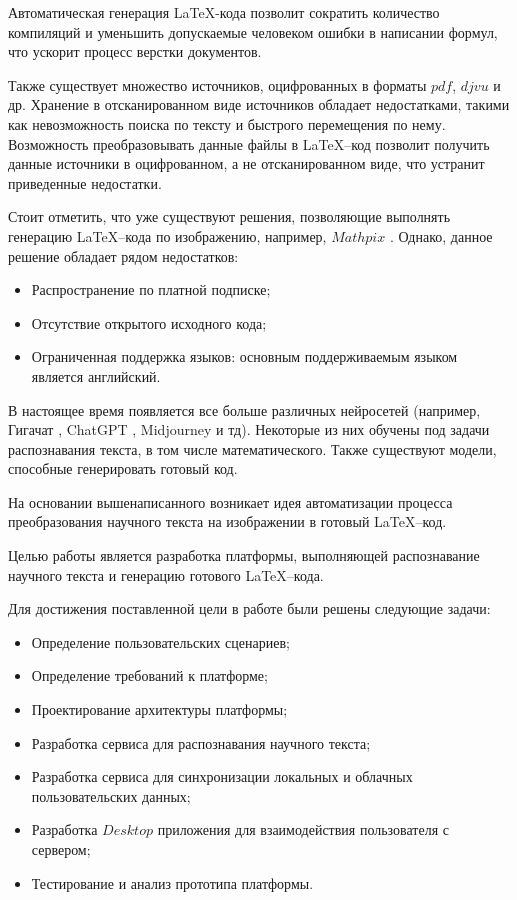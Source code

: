 Автоматическая генерация \LaTeX\--кода позволит сократить количество компиляций и уменьшить допускаемые человеком ошибки в написании формул, что ускорит процесс верстки документов.

Также существует множество источников, оцифрованных в форматы $pdf$, $djvu$ и др. 
Хранение в отсканированном виде источников обладает недостатками, такими как невозможность поиска по тексту и быстрого перемещения по нему.
Возможность преобразовывать данные файлы в \LaTeX--код позволит получить данные источники в оцифрованном, а не отсканированном виде, что устранит приведенные недостатки.

Стоит отметить, что уже существуют решения, позволяющие выполнять генерацию \LaTeX--кода по изображению, например, $Mathpix$ \cite{mathpix}. Однако, данное решение обладает рядом недостатков:
\begin{itemize}
    \item Распространение по платной подписке;
    \item Отсутствие открытого исходного кода;
    \item Ограниченная поддержка языков: основным поддерживаемым языком является английский.
\end{itemize}

В настоящее время появляется все больше различных нейросетей (например, Гигачат \cite{gigachat}, ChatGPT \cite{chat_gpt}, Midjourney \cite{midjourney} и тд). Некоторые из них обучены под задачи распознавания текста, в том числе математического. 
Также существуют модели, способные генерировать готовый код. 

На основании вышенаписанного возникает идея автоматизации процесса преобразования научного текста на изображении в готовый \LaTeX--код.


Целью работы является разработка платформы, выполняющей распознавание научного текста и  генерацию готового \LaTeX--кода.

Для достижения поставленной цели в работе были решены следующие задачи:
\begin{itemize}
    \item Определение пользовательских сценариев;
    \item Определение требований к платформе;
    \item Проектирование архитектуры платформы;
    \item Разработка сервиса для распознавания научного текста;
    \item Разработка сервиса для синхронизации локальных и облачных пользовательских данных;
    \item Разработка $Desktop$ приложения для взаимодействия пользователя с сервером;
    \item Тестирование и анализ прототипа платформы.
\end{itemize}

